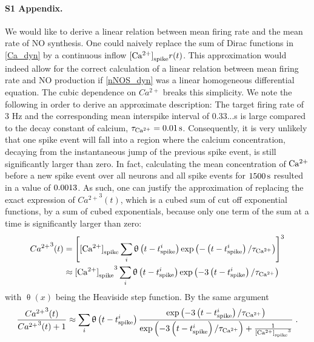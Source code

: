 \documentclass[10pt,letterpaper]{article}
\begin{document}
\paragraph*{S1 Appendix.}
\label{S1_Appendix}
We would like to derive a linear relation between mean firing rate  and the mean rate of NO synthesis. One could naively replace the sum of Dirac functions in \eqref{Ca_dyn} by a continuous inflow ${\rm [Ca^{2+}]}_{\rm spike} r(t)$. This approximation would indeed allow for the correct calculation of a linear relation between mean firing rate and NO production if \eqref{nNOS_dyn} was a linear homogeneous differential equation. The cubic dependence on $Ca^{2+}$ breaks this simplicity. We note the following in order to derive an approximate description: The target firing rate of 3 Hz and the corresponding mean interspike interval of 0.33...s is large compared to the decay constant of calcium, $\tau_{\rm Ca^{2+}} = \mathrm{0.01\,s}$. Consequently, it is very unlikely that one spike event will fall into a region where the calcium concentration, decaying from the instantaneous jump of the previous spike event, is still significantly larger than zero. In fact, calculating the mean concentration of $\rm Ca^{2+}$ before a new spike event over all neurons and all spike events for $\rm 1500\,s$ resulted in a value of $\rm 0.0013$. As such, one can justify the approximation of replacing the exact expression of ${Ca^{2+}}^3(t)$, which is a cubed sum of cut off exponential functions, by a sum of cubed exponentials, because only one term of the sum at a time is significantly larger than zero:
\begin{equation}
\begin{split}
{Ca^{2+}}^3(t) &= \left[ {\rm [Ca^{2+}]}_{\rm spike} \sum_{i} \mathrm{\uptheta} \left( t-t^i_{\rm spike} \right) \exp \left( - \left( t-t^i_{\rm spike} \right) /\tau_{\rm Ca^{2+}} \right) \right]^3 \\
&\approx {{\rm [Ca^{2+}]}_{\rm spike}}^3 \sum_{i} \uptheta \left( t-t^i_{\rm spike} \right) \exp \left( -3 \left( t-t^i_{\rm spike} \right) /\tau_{\rm Ca^{2+}} \right) 
\end{split} \label{cubic_approx_1}			
\end{equation}
with $\uptheta(x)$ being the Heaviside step function. By the same argument
\begin{equation}
\frac{{Ca^{2+}}^3(t)}{{Ca^{2+}}^3(t)+1} \approx \sum_{i} \uptheta \left( t-t^i_{\rm spike} \right) \frac{ \exp \left( -3 \left( t-t^i_{\rm spike} \right) /\tau_{\rm Ca^{2+}} \right) }{\exp \left( -3 \left( t-t^i_{\rm spike} \right) /\tau_{\rm Ca^{2+}} \right) + \frac{1}{{{\rm [Ca^{2+}]}_{\rm spike}}^3}} \; .
\end{equation}
\end{document}
